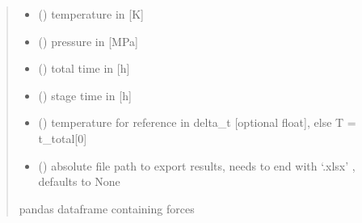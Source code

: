 \documentclass[letterpaper,10pt,english]{sphinxmanual}
\begin{document}
\begin{fulllineitems}
\begin{fulllineitems}
\begin{quote}
\begin{description}
\begin{itemize}
\item {} 
\sphinxAtStartPar
{} (\sphinxstyleliteralemphasis{\sphinxupquote{{[}}}\sphinxstyleliteralemphasis{\sphinxupquote{{]} }}) \textendash{} temperature  in {[}K{]}

\item {} 
\sphinxAtStartPar
{} (\sphinxstyleliteralemphasis{\sphinxupquote{{[}}}\sphinxstyleliteralemphasis{\sphinxupquote{{]} }}) \textendash{} pressure in {[}MPa{]}

\item {} 
\sphinxAtStartPar
{} (\sphinxstyleliteralemphasis{\sphinxupquote{{[}}}\sphinxstyleliteralemphasis{\sphinxupquote{{]} }}) \textendash{} total time  in {[}h{]}

\item {} 
\sphinxAtStartPar
{} (\sphinxstyleliteralemphasis{\sphinxupquote{{[}}}\sphinxstyleliteralemphasis{\sphinxupquote{{]} }}) \textendash{} stage time  in {[}h{]}

\item {} 
\sphinxAtStartPar
{} (\sphinxstyleliteralemphasis{\sphinxupquote{, }}) \textendash{} temperature for reference in delta\_t {[}optional \sphinxhyphen{} float{]}, else T = t\_total{[}0{]}

\item {} 
\sphinxAtStartPar
{} (\sphinxstyleliteralemphasis{\sphinxupquote{, }}) \textendash{} absolute file path to export results, needs to end with ‘.xlsx’ , defaults to None

\end{itemize}

\sphinxAtStartPar
pandas dataframe containing forces


\end{description}
\end{quote}
\end{fulllineitems}
\end{fulllineitems}
\end{document}
